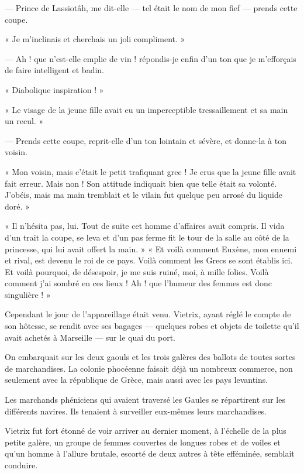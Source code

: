 \documentclass[a4paper, 11pt, oneside, polutonikogreek, french]{article}
\begin{document}
--- Prince de Lassiotâh, me dit-elle --- tel était le nom de mon fief --- prends cette coupe.

« Je m'inclinais et cherchais un joli compliment. »

--- Ah ! que n'est-elle emplie de vin ! répondis-je enfin d'un ton que je m'efforçais de faire intelligent et badin.

« Diabolique inspiration ! »

« Le visage de la jeune fille avait eu un imperceptible tressaillement et sa main un recul. »

--- Prends cette coupe, reprit-elle d'un ton lointain et sévère, et donne-la à ton voisin.

« Mon voisin, mais c'était le petit trafiquant grec ! Je crus que la jeune fille avait fait erreur. Mais non ! Son attitude indiquait bien que telle était sa volonté. J'obéis, mais ma main tremblait et le vilain fut quelque peu arrosé du liquide doré. »

« Il n'hésita pas, lui. Tout de suite cet homme d'affaires avait compris. Il vida d'un trait la coupe, se leva et d'un pas ferme fit le tour de la salle au côté de la princesse, qui lui avait offert la main. »
 «  Et voilà comment Euxène, mon ennemi et rival, est devenu le roi de ce pays. Voilà comment les Grecs se sont établis ici. Et voilà pourquoi, de désespoir, je me suis ruiné, moi, à mille folies. Voilà comment j'ai sombré en ces lieux ! Ah ! que l'humeur des femmes est donc singulière ! »

\bigskip
\centerline{\EightStarTaper}
\centerline{\EightStarTaper\EightStarTaper}
\bigskip

Cependant le jour de l'appareillage était venu. Vietrix, ayant réglé le compte de son hôtesse, se rendit avec ses bagages --- quelques robes et objets de toilette qu'il avait achetés à Marseille --- sur le quai du port.

On embarquait sur les deux gaouls et les trois galères des ballots de toutes sortes de marchandises. La colonie phocéenne faisait déjà un nombreux commerce, non seulement avec la république de Grèce, mais aussi avec les pays levantins.

Les marchands phéniciens qui avaient traversé les Gaules se répartirent sur les différents navires. Ils tenaient à surveiller eux-mêmes leurs marchandises.

Vietrix fut fort étonné de voir arriver au dernier moment, à l'échelle de la plus petite galère, un groupe de femmes couvertes de longues robes et de voiles et qu'un homme à l'allure brutale, escorté de deux autres à tête efféminée, semblait conduire.
\end{document}
